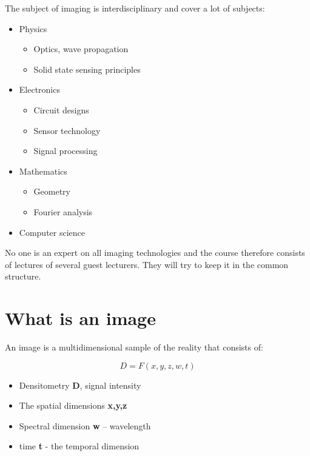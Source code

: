 The subject of imaging is interdisciplinary and cover a lot of subjects:

\begin{itemize}
	\item Physics
	\begin{itemize}
		\item Optics, wave propagation
		\item Solid state sensing principles
	\end{itemize}
	\item Electronics
	\begin{itemize}
		\item Circuit designs
		\item Sensor technology
		\item Signal processing
	\end{itemize}
	\item Mathematics
	\begin{itemize}
		\item Geometry
		\item Fourier analysis
	\end{itemize}
	\item Computer science
\end{itemize}

No one is an expert on all imaging technologies and the course therefore consists of lectures of several guest lecturers. They will try to keep it in the common structure. 

\section{What is an image}
An image is a multidimensional sample of the reality that consists of: 

\begin{equation}
D = F(x,y,z,w,t)
\end{equation}

\begin{wbox}{}
\begin{itemize}
	\item Densitometry \textbf{D}, signal intensity
	\item The spatial dimensions \textbf{x,y,z}
	\item Spectral dimension \textbf{w} – wavelength
	\item time \textbf{t} - the temporal dimension 
\end{itemize}
\end{wbox}

